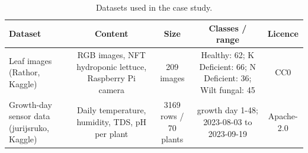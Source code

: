 \begin{table}[t]
\centering
\caption{Datasets used in the case study.}
\label{tab:datasets}
\begin{tabular}{lcccc}
\toprule
Dataset & Content & Size & Classes / range & Licence \\
\midrule
Leaf images (Rathor, Kaggle) & RGB images, NFT hydroponic lettuce, Raspberry Pi camera & 209 images & Healthy: 62; K Deficient: 66; N Deficient: 36; Wilt fungal: 45 & CC0 \\
Growth-day sensor data (jurijsruko, Kaggle) & Daily temperature, humidity, TDS, pH per plant & 3169 rows / 70 plants & growth day 1-48; 2023-08-03 to 2023-09-19 & Apache-2.0 \\
\bottomrule
\end{tabular}
\end{table}